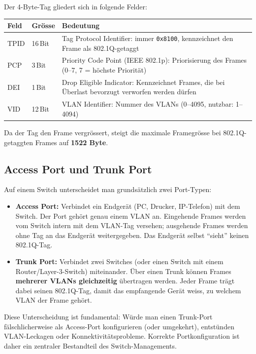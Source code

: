 \documentclass[11pt, oneside, numbers=nönddot]{scrbook}
\begin{document}
Der 4-Byte-Tag gliedert sich in folgende Felder:

\begin{longtable}{|p{2.8cm}|p{1.8cm}|p{8.7cm}|}
\hline
\textbf{Feld} & \textbf{Grösse} & \textbf{Bedeutung} \\
\hline
TPID & 16\,Bit & Tag Protocol Identifier: immer \texttt{0x8100}, kennzeichnet den Frame als 802.1Q-getaggt \\
\hline
PCP & 3\,Bit & Priority Code Point (IEEE 802.1p): Priorisierung des Frames (0--7, 7 = höchste Priorität) \\
\hline
DEI & 1\,Bit & Drop Eligible Indicator: Kennzeichnet Frames, die bei Überlast bevorzugt verworfen werden dürfen \\
\hline
VID & 12\,Bit & VLAN Identifier: Nummer des VLANs (0--4095, nutzbar: 1--4094) \\
\hline
\end{longtable}

Da der Tag den Frame vergrössert, steigt die maximale Framegrösse bei 802.1Q-getaggten Frames auf \textbf{1522 Byte}.

\subsection{Access Port und Trunk Port}
Auf einem Switch unterscheidet man grundsätzlich zwei Port-Typen:

\begin{itemize}
\item \textbf{Access Port:} Verbindet ein Endgerät (PC, Drucker, IP-Telefon) mit dem Switch. Der Port gehört genau einem VLAN an. Eingehende Frames werden vom Switch intern mit dem VLAN-Tag versehen; ausgehende Frames werden ohne Tag an das Endgerät weitergegeben. Das Endgerät selbst ``sieht'' keinen 802.1Q-Tag.
\item \textbf{Trunk Port:} Verbindet zwei Switches (oder einen Switch mit einem Router/Layer-3-Switch) miteinander. Über einen Trunk können Frames \textbf{mehrerer VLANs gleichzeitig} übertragen werden. Jeder Frame trägt dabei seinen 802.1Q-Tag, damit das empfangende Gerät weiss, zu welchem VLAN der Frame gehört.
\end{itemize}

Diese Unterscheidung ist fundamental: Würde man einen Trunk-Port fälschlicherweise als Access-Port konfigurieren (oder umgekehrt), entstünden VLAN-Leckagen oder Konnektivitätsprobleme. Korrekte Portkonfiguration ist daher ein zentraler Bestandteil des Switch-Managements.
\end{document}
